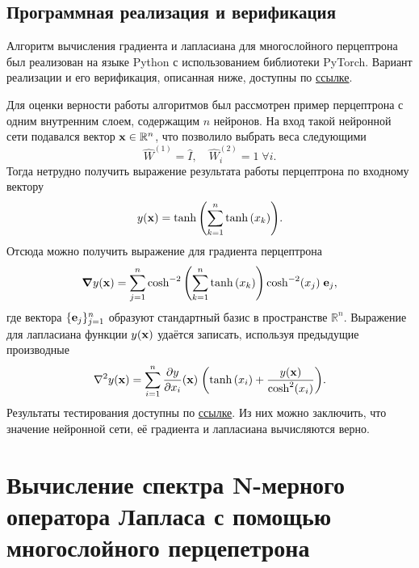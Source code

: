 \documentclass[11pt]{article}
\begin{document}
\subsection{Программная реализация и верификация}

Алгоритм вычисления градиента и лапласиана для многослойного перцептрона был реализован на языке Python с использованием библиотеки PyTorch. Вариант реализации и его верификация, описанная ниже, доступны по \href{https://github.com/MrKozelberg/laplacian_perceptron/blob/main/laplacian.ipynb}{ссылке}.

Для оценки верности работы алгоритмов был рассмотрен пример перцептрона с одним внутренним слоем, содержащим $n$ нейронов. На вход такой нейронной сети подавался вектор $\vb{x}\in\mathbb{R}^n$, что позволило выбрать веса следующими
\begin{equation}
 \hat W^{(1)} = \hat I,\quad \hat W^{(2)}_i = 1\; \forall i.
\end{equation}
Тогда нетрудно получить выражение результата работы перцептрона по входному вектору
\begin{equation}
 y(\vb{x}) = \tanh\qty(\sum_{k=1}^n\tanh\qty(x_k)).
\end{equation}
Отсюда можно получить выражение для градиента перцептрона
\begin{equation}
 \grad{y} (\vb{x})= \sum_{j=1}^n \cosh^{-2}\qty(\sum_{k=1}^n\tanh\qty(x_k)) \cosh^{-2}(x_j)\; \vb{e}_j,
\end{equation}
где вектора $\{ \vb{e}_j\}_{j=1}^n$ образуют стандартный базис в пространстве $\mathbb{R}^n$. Выражение для лапласиана функции $y(\vb{x})$ удаётся записать, используя предыдущие производные
\begin{equation}
\begin{split}
 \laplacian{y} (\vb{x}) = \sum_{i=1}^n \pdv{y}{x_i} \qty(\vb{x})\; \qty(\tanh\qty(x_i) + \dfrac{y(\vb{x})}{\cosh^2(x_i)}).
\end{split}
\end{equation}
Результаты тестирования доступны по \href{https://github.com/MrKozelberg/laplacian_perceptron/blob/main/laplacian.ipynb}{ссылке}. Из них можно заключить, что значение нейронной сети, её градиента и лапласиана вычисляются верно.

\section{Вычисление спектра N-мерного оператора Лапласа с помощью многослойного перцепетрона}
\end{document}
